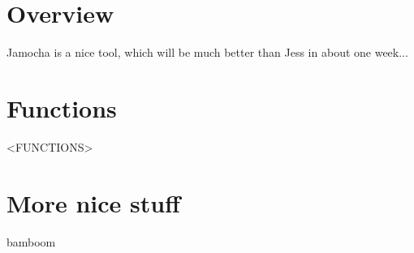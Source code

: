 \documentclass[a4paper,12pt]{scrbook}
\begin{document}
\tableofcontents
\newpage

\section{Overview}
Jamocha is a nice tool, which will be much better than Jess in about one week...

\section{Functions}
<FUNCTIONS>

\section{More nice stuff}
bamboom
\end{document}

